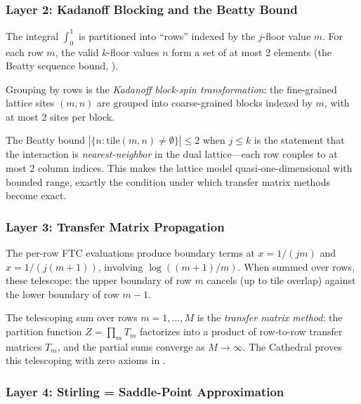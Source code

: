 \documentclass[11pt,a4paper]{article}
\begin{document}
\subsubsection{Layer 2: Kadanoff Blocking and the Beatty Bound}

The integral $\int_0^1$ is partitioned into ``rows'' indexed by the
$j$-floor value $m$. For each row $m$, the valid $k$-floor values
$n$ form a set of at most 2 elements (the Beatty sequence bound,
).

\begin{correspondence}
Grouping by rows is the \emph{Kadanoff block-spin transformation}:
the fine-grained lattice sites $(m,n)$ are grouped into coarse-grained
blocks indexed by $m$, with at most 2 sites per block.

The Beatty bound $|\{n : \text{tile}(m,n) \neq \emptyset\}| \leq 2$
when $j \leq k$ is the statement that the interaction is
\emph{nearest-neighbor} in the dual lattice---each row couples to at
most 2 column indices. This makes the lattice model quasi-one-dimensional
with bounded range, exactly the condition under which transfer matrix
methods become exact.
\end{correspondence}

\subsubsection{Layer 3: Transfer Matrix Propagation}

The per-row FTC evaluations produce boundary terms at $x = 1/(jm)$
and $x = 1/(j(m+1))$, involving $\log((m+1)/m)$. When summed over
rows, these telescope: the upper boundary of row $m$ cancels (up to
tile overlap) against the lower boundary of row $m-1$.

\begin{principle}
The telescoping sum over rows $m = 1, \ldots, M$ is the
\emph{transfer matrix method}: the partition function
$Z = \prod_{m} T_m$ factorizes into a product of row-to-row
transfer matrices $T_m$, and the partial sums
converge as $M \to \infty$. The Cathedral proves this telescoping
with zero axioms in .
\end{principle}

\subsubsection{Layer 4: Stirling = Saddle-Point Approximation}
\end{document}
